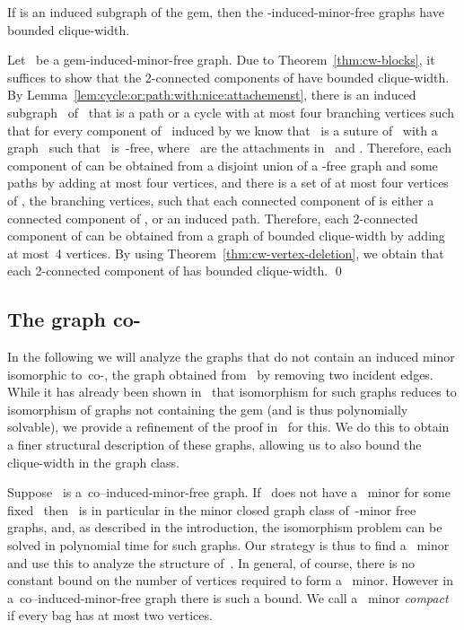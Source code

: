 \documentclass[envcountsame,envcountsect,11pt,a4paper]{llncs}
\renewenvironment{proof}{\begin{Proof}}{\qed\end{Proof}}
\begin{document}
\begin{theorem}
\label{thm:gem_cw}
If  is an induced subgraph of the gem,
then the -induced-minor-free graphs have bounded clique-width.
\end{theorem}
\begin{proof}
Let~ be a gem-induced-minor-free graph. Due to Theorem~\ref{thm:cw-blocks}, it suffices to show that the 2-connected components of  have bounded clique-width.
By Lemma~\ref{lem:cycle:or:path:with:nice:attachemenst}, there is an induced subgraph~ of~ that is a path or a cycle with at most four branching vertices such that for every component
of~ induced by  we know that~ is a suture of~ with a graph~ such that~ is~-free, where~ are the attachments in~ and . 
Therefore, each component of  can be obtained from a disjoint union of a -free graph and some paths
by adding at most four vertices, and there is a set  of at
most four vertices of , the branching vertices, such that each connected component of  is either a connected component of , or an
induced path. Therefore, each 2-connected component of  can be obtained from a graph of bounded clique-width by adding at most~4
vertices. By using Theorem~\ref{thm:cw-vertex-deletion}, we obtain that each 2-connected component of  has bounded clique-width.
\end{proof}

\subsection{The graph co-}

In the following we will analyze the graphs that do not contain an induced minor isomorphic to~co-, the graph obtained from~ by removing two incident edges. While it has already been shown in~\cite{Ponomarenko88} that isomorphism for such graphs reduces to isomorphism of graphs not containing the gem (and is thus polynomially solvable), we provide a refinement of the proof in~\cite{Ponomarenko88} for this. We do this to obtain a finer structural description of these graphs, allowing us to also bound the clique-width in the graph class.

Suppose~ is a~co--induced-minor-free graph. If~ does not have a~ minor for some fixed~ then~ is in particular in the minor closed graph class of~-minor free graphs, and, as described in the introduction, the isomorphism problem can be solved in polynomial time for such graphs. 
Our strategy is thus to find a~ minor and use this to analyze the structure of~. In general, of course, there is no constant bound
on the number of vertices required to form a~ minor. However in a~co--induced-minor-free graph there is such a
bound. We call a~ minor \emph{compact} if every bag has at most two vertices.
\end{document}
